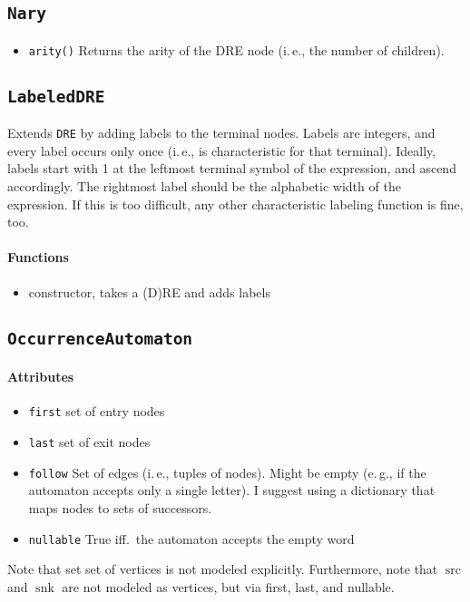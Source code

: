 \documentclass[a4paper,11pt, svgnames,titlepage]{article}
\DeclareMathOperator{\src}{src}
\DeclareMathOperator{\snk}{snk}
\begin{document}
\subsection{\texttt{Nary}}\label{sec:des:nary}
\begin{itemize}
	\item\texttt{arity()} Returns the arity of the DRE node (i.\,e., the number of children).
\end{itemize}


\subsection{\texttt{LabeledDRE}}\label{sec:des:ldre}
Extends \texttt{DRE} by adding labels to the terminal nodes. Labels are integers, and every label occurs only once (i.\,e., is characteristic for that terminal). Ideally, labels start with 1 at the leftmost terminal symbol of the expression, and ascend accordingly. The rightmost label should be the alphabetic width of the expression. If this is too difficult, any other characteristic labeling function is fine, too.
\paragraph{Functions}
\begin{itemize}
	\item constructor, takes a (D)RE and adds labels
\end{itemize}

\subsection{\texttt{OccurrenceAutomaton}}\label{sec:des:oa}
\paragraph{Attributes}
\begin{itemize}
	\item\texttt{first} set of entry nodes
	\item\texttt{last} set of exit nodes
	\item\texttt{follow} Set of edges (i.\,e., tuples of nodes). Might be empty (e.\,g., if the automaton accepts only a single letter). I suggest using a dictionary that maps nodes to sets of successors. 
	\item\texttt{nullable} True iff.\ the automaton accepts the empty word
\end{itemize}
Note that set set of vertices is not modeled explicitly. Furthermore, note that $\src$ and $\snk$ are not modeled as vertices, but via first, last, and nullable.
\end{document}
